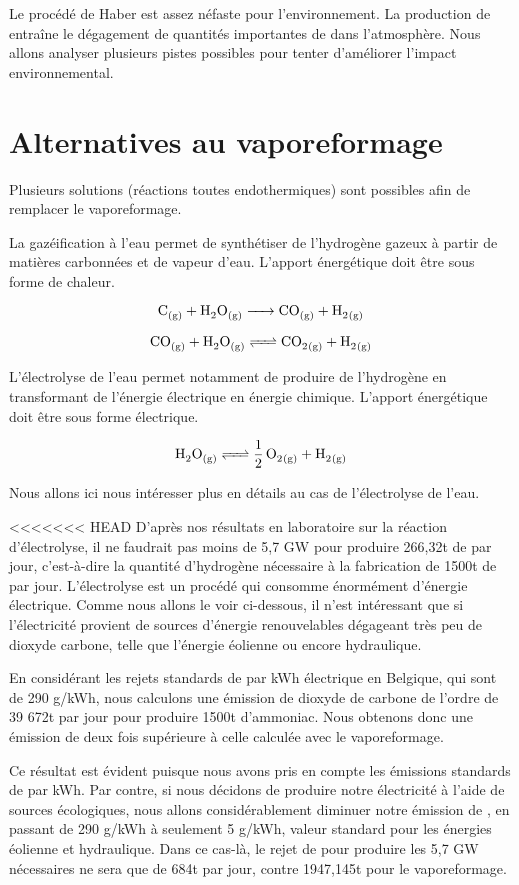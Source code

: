 \documentclass[a4paper, oneside, 12pt]{article}
\begin{document}
Le procédé de Haber est assez néfaste pour l'environnement. 
La production de  entraîne le dégagement de quantités 
importantes de  dans l'atmosphère.
Nous allons analyser plusieurs pistes possibles pour tenter 
d'améliorer l'impact environnemental.

\section*{Alternatives au vaporeformage}

Plusieurs solutions (réactions toutes endothermiques) 
sont possibles afin de remplacer le vaporeformage.

La gazéification à l'eau permet de synthétiser de l'hydrogène 
gazeux à partir de matières carbonnées et de vapeur d'eau.
L'apport énergétique doit être sous forme de chaleur.

\[ \ce{C_{(g)} + H2O_{(g)} -> CO_{(g)} + H2_{(g)}} \]

\[ \ce{CO_{(g)} + H2O_{(g)} <=> CO2_{(g)} + H2_{(g)}} \]

L'électrolyse de l'eau permet notamment de produire de l'hydrogène 
en transformant de l'énergie électrique en énergie chimique.
L'apport énergétique doit être sous forme électrique.

\[ \ce{H2O_{(g)} <=> \frac{1}{2} \, O2_{(g)} + H2_{(g)}} \]

Nous allons ici nous intéresser plus en détails au cas de l'électrolyse de l'eau. 

<<<<<<< HEAD
D'après nos résultats en laboratoire sur la réaction d'électrolyse, il ne faudrait pas moins de 5,7 GW pour produire 266,32t de  par jour, c'est-à-dire la quantité d'hydrogène nécessaire à la fabrication de 1500t de  par jour. L'électrolyse est un procédé qui consomme énormément d'énergie électrique. Comme nous allons le voir ci-dessous, il n'est intéressant que si l'électricité provient de sources d'énergie renouvelables dégageant très peu de dioxyde carbone, telle que l'énergie éolienne ou encore hydraulique.

En considérant les rejets standards de  par kWh électrique en Belgique, qui sont de 290 g/kWh, nous calculons une émission de dioxyde de carbone de l'ordre de 39 672t par jour pour produire 1500t d'ammoniac. Nous obtenons donc une émission de  deux fois supérieure à celle calculée avec le vaporeformage.

Ce résultat est évident puisque nous avons pris en compte les émissions standards de  par kWh.
Par contre, si nous décidons de produire notre électricité à l'aide de sources écologiques, nous allons considérablement diminuer notre émission de , en passant de 290
g/kWh à seulement 5 g/kWh, valeur standard pour les énergies éolienne et hydraulique. Dans ce cas-là, le rejet de  pour produire les 5,7 GW nécessaires ne sera que de 684t par jour, contre 1947,145t pour le vaporeformage. 
\newline
\end{document}
